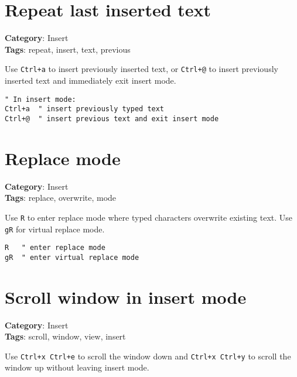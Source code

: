 {{{{{{\section{Repeat last inserted text}

\textbf{Category}: Insert\\ \textbf{Tags}: repeat, insert, text, previous
\vspace{0.5cm}

Use {\footnotesize \Verb§Ctrl+a§} to insert previously inserted text, or {\footnotesize \Verb§Ctrl+@§} to insert previously inserted text and immediately exit insert mode.

\begin{Exa*}{}
\begin{Verbatim}[fontsize=\footnotesize, breaklines, breakanywhere]
" In insert mode:
Ctrl+a  " insert previously typed text
Ctrl+@  " insert previous text and exit insert mode
\end{Verbatim}
\end{Exa*}

\section{Replace mode}

\textbf{Category}: Insert\\ \textbf{Tags}: replace, overwrite, mode
\vspace{0.5cm}

Use {\footnotesize \Verb§R§} to enter replace mode where typed characters overwrite existing text. Use {\footnotesize \Verb§gR§} for virtual replace mode.

\begin{Exa*}{}
\begin{Verbatim}[fontsize=\footnotesize, breaklines, breakanywhere]
R   " enter replace mode
gR  " enter virtual replace mode
\end{Verbatim}
\end{Exa*}

\section{Scroll window in insert mode}

\textbf{Category}: Insert\\ \textbf{Tags}: scroll, window, view, insert
\vspace{0.5cm}

Use {\footnotesize \Verb§Ctrl+x Ctrl+e§} to scroll the window down and {\footnotesize \Verb§Ctrl+x Ctrl+y§} to scroll the window up without leaving insert mode.

}}}}}}
